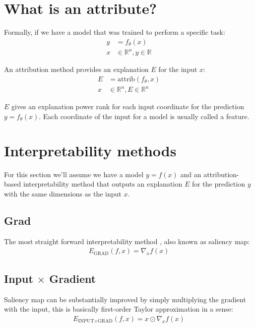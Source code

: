\documentclass[12pt]{report}
\begin{document}
\section{What is an attribute?}
Formally, if we have a model that was trained to perform a specific task:
\begin{align*}
	y & = f_{\theta}(x) \\
	x & \in \mathbb{R}^n, y \in \mathbb{R}
\end{align*}

An attribution method provides an explanation $E$ for the input $x$:
\begin{align*}
	E &= \text{attrib}(f_{\theta}, x) \\
	x & \in \mathbb{R}^n, E \in \mathbb{R}^n
\end{align*}

$E$ gives an explanation power rank for each input coordinate for the prediction $y=f_{\theta}(x)$. Each coordinate of the input for a model is usually called a feature. 



\newpage
\section{Interpretability methods}

For this section we'll assume we have a model $y=f(x)$ and an attribution-based interpretability  method that outputs an explanation $E$ for the prediction $y$ with the same dimensions as the input $x$.

\subsection{Grad}
	The most straight forward interpretability method \cite{baehrens2010explain} \cite{https://doi.org/10.48550/arxiv.1312.6034}, also known as saliency map:
\begin{align*}
	E_\text{GRAD}(f, x)  = \nabla_{x}f(x)
\end{align*}


\subsection{Input $\times$ Gradient}
Saliency map can be substantially improved \cite{DBLP:journals/corr/ShrikumarGSK16} by simply multiplying the gradient with the input, this is basically first-order Taylor approximation in a sense:
\begin{align*}
	E_{\text{INPUT} \times \text{GRAD}}(f, x)  = x \odot \nabla_{x}f(x)
\end{align*}
\end{document}
